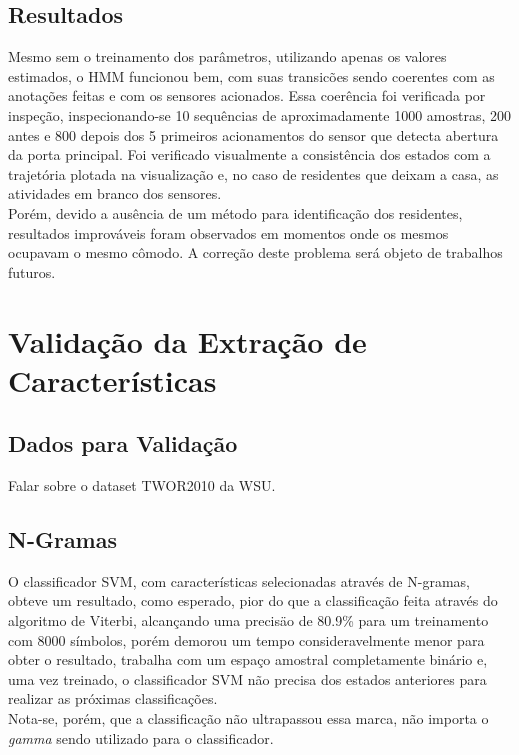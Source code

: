 \documentclass[
	12pt,				%
	openright,			%
	twoside,			%
	a4paper,			%
	english,			%
	spanish,			%
	brazil,				%
	]{abntex2}\usepackage[]{graphicx}\usepackage[]{color}
\begin{document}
\subsection{Resultados}

Mesmo sem o treinamento dos parâmetros, utilizando apenas os valores estimados, o HMM funcionou bem, com suas transicões sendo coerentes com as anotações feitas e com os sensores acionados. Essa coerência foi verificada por inspeção, inspecionando-se 10 sequências de aproximadamente 1000 amostras, 200 antes e 800 depois dos 5 primeiros acionamentos do sensor que detecta abertura da porta principal. Foi verificado visualmente a consistência dos estados com a trajetória plotada na visualização e, no caso de residentes que deixam a casa, as atividades em branco dos sensores. \\
Porém, devido a ausência de um método para identificação dos residentes, resultados improváveis foram observados em momentos onde os mesmos ocupavam o mesmo cômodo. A correção deste problema será objeto de trabalhos futuros.

\section{Validação da Extração de Características}

\subsection{Dados para Validação}

Falar sobre o dataset TWOR2010 da WSU.


\subsection{N-Gramas}

O classificador SVM, com características selecionadas através de N-gramas, obteve um resultado, como esperado, pior do que a classificação feita através do algoritmo de Viterbi, alcançando uma precisäo de 80.9\% para um treinamento com 8000 símbolos, porém demorou um tempo consideravelmente menor para obter o resultado, trabalha com um espaço amostral completamente binário e, uma vez treinado, o classificador SVM não precisa dos estados anteriores para realizar as próximas classificações. \\
Nota-se, porém, que a classificação não ultrapassou essa marca, não importa o \textit{gamma} sendo utilizado para o classificador.
\end{document}
